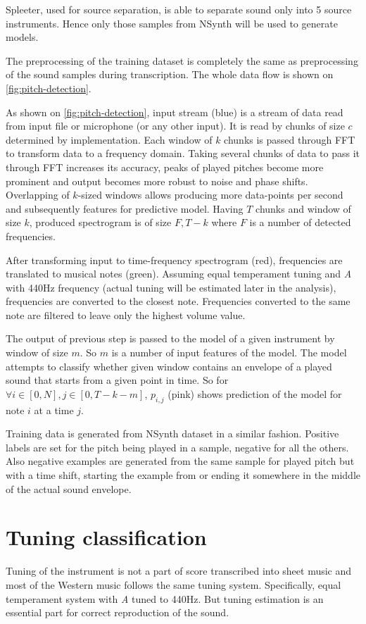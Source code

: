 Spleeter, used for source separation, is able to separate sound only into 5 source instruments. Hence only those samples
from NSynth will be used to generate models.

The preprocessing of the training dataset is completely the same as preprocessing of the sound samples during
transcription. The whole data flow is shown on \cref{fig:pitch-detection}.


As shown on \cref{fig:pitch-detection}, input stream (blue) is a stream of data read from input file or microphone (or
any other input). It is read by chunks of size $c$ determined by implementation. Each window of $k$ chunks is passed
through \ac{FFT} to transform data to a frequency domain. Taking several chunks of data to pass it through \ac{FFT}
increases its accuracy, peaks of played pitches become more prominent and output becomes more robust to noise and phase
shifts. Overlapping of $k$-sized windows allows producing more data-points per second and subsequently features for
predictive model. Having $T$ chunks and window of size $k$, produced spectrogram is of size $F,T-k$ where $F$ is
a number of detected frequencies.

After transforming input to time-frequency spectrogram (red), frequencies are translated to musical notes (green).
Assuming equal temperament tuning and \textit{A} with 440Hz frequency (actual tuning will be estimated later in
the analysis), frequencies are converted to the closest note. Frequencies converted to the same note are filtered
to leave only the highest volume value.

The output of previous step is passed to the model of a given instrument by window of size $m$. So $m$ is a number of
input features of the model. The model attempts to classify whether given window contains an envelope of a played sound
that starts from a given point in time. So for $\forall{i} \in [0,N], j \in [0,T-k-m]$, $p_{i,j}$ (pink) shows
prediction of the model for note $i$ at a time $j$.

Training data is generated from NSynth dataset in a similar fashion. Positive labels are set for the pitch being played
in a sample, negative for all the others. Also negative examples are generated from the same sample for played pitch but
with a time shift, starting the example from or ending it somewhere in the middle of the actual sound envelope.


\section{Tuning classification}\label{sec:tunning-classification}
Tuning of the instrument is not a part of score transcribed into sheet music and most of the Western music follows
the same tuning system. Specifically, equal temperament system with \textit{A} tuned to 440Hz. But tuning estimation is
an essential part for correct reproduction of the sound.

